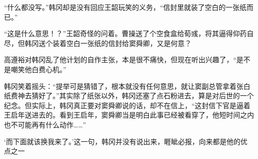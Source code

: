 “什么都没写。”韩冈却是没有回应王韶玩笑的义务，“信封里就装了空白的一张纸而已。”

“这是什么意思！？”王韶奇怪的问着。曹操送了个空食盒给荀彧，将其逼得仰药自尽，但韩冈送个装着空白一张纸的信封给窦舜卿，又是何意？

高遵裕对韩冈乱了他计划的自作主张，本是很不痛快，但现在听出兴趣了，“是不是嘲笑他白费心机。”

韩冈笑着摇头：“提举可是猜错了，根本就没有任何意思，就让窦副总管拿着张白纸费神去猜好了。”其实除了纸张以外，韩冈还塞了点石粉进去，算是对后世的一个纪念。但实际上，韩冈真正要对窦舜卿说的话，却不在信上，“这封信下官是逼着王启年送进去的。看到王启年，窦舜卿当是明白此事已经被看穿了，他短时间之内也不可能再有什么动作……”

‘而下面就该换我来了。’这一句，韩冈并没有说出来，睚眦必报，向来都是他的优点之一

